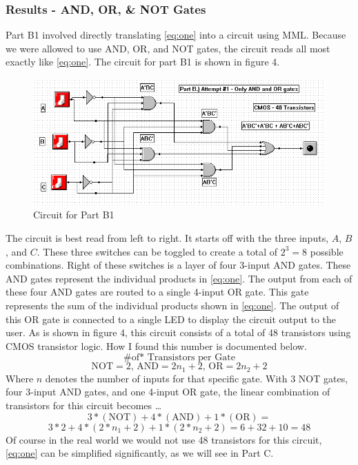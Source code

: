 \documentclass[a4paper,11pt]{article}
\begin{document}
\subsubsection{Results - AND, OR, \& NOT Gates} 
Part B1 involved directly translating \eqref{eq:one} into a circuit using MML. Because we were allowed to use AND, OR, and NOT gates, the circuit reads all most exactly like \eqref{eq:one}. The circuit for part B1 is shown in figure 4.

\begin{figure}[h!]
   \centering
     \includegraphics[width=6in]{PartB1Circuit}
   \caption{Circuit for Part B1}
   \label{fig:b1circuit}
\end{figure} 

The circuit is best read from left to right. It starts off with the three inputs, $A$, $B$, and $C$. These three switches can be toggled to create a total of $2^3 = 8$ possible combinations. Right of these switches is a layer of four 3-input AND gates. These AND gates represent the individual products in \eqref{eq:one}. The output from each of these four AND gates are routed to a single 4-input OR gate. This gate represents the sum of the individual products shown in \eqref{eq:one}. The output of this OR gate is connected to a single LED to display the circuit output to the user. As is shown in figure 4, this circuit consists of a total of 48 transistors using CMOS transistor logic. How I found this number is documented below.
\[ \text{\# of* Transistors per Gate}\]
\[ \text{NOT} = 2 \text{, AND} = 2n_1+2 \text{, OR} = 2n_2+2 \]
Where $n$ denotes the number of inputs for that specific gate. With 3 NOT gates, four 3-input AND gates, and one 4-input OR gate, the linear combination of transistors for this circuit becomes \ldots
\[ 3*(\text{NOT})+4*(\text{AND})+1*(\text{OR}) = \]
\[ 3*2+4*(2*n_1+2)+1*(2*n_2+2) = 6+32+10 = 48\]
Of course in the real world we would not use 48 transistors for this circuit, \eqref{eq:one} can be simplified significantly, as we will see in Part C.
\par
\end{document}
